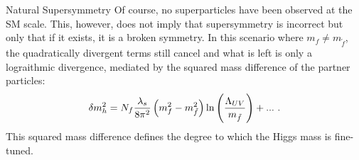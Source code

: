 \begin{section}{Natural Supersymmetry}
Of course, no superparticles have been observed at the SM scale.
This, however, does not imply that supersymmetry is incorrect but only that if it exists, it is a broken symmetry.
In this scenario where $m_f \neq m_{\tilde{f}}$, the quadratically divergent terms still cancel and what is left is only a lograithmic divergence, mediated by the squared mass difference of the partner particles:
\begin{align}
\delta m_{h}^2 = N_f\frac{\lambda_s}{8\pi^2} \left(m_f^2 - m_{\tilde{f}}^2\right) \ln\left(\frac{\Lambda_{UV}}{m_{\tilde{f}}}\right) + ...\ .
\label{eqn:total_higgs_correction}
\end{align}
This squared mass difference defines the degree to which the Higgs mass is fine-tuned.

\end{section}

